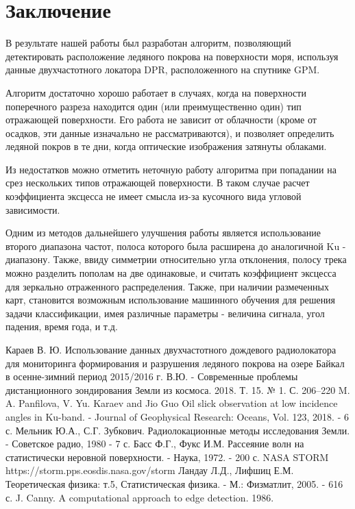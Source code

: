 \section{Заключение}

В результате нашей работы был разработан алгоритм, позволяющий детектировать расположение ледяного покрова на
поверхности моря, используя данные двухчастотного локатора DPR, расположенного на спутнике GPM. 

Алгоритм достаточно хорошо работает в случаях, когда на поверхности поперечного разреза находится один (или
преимущественно один) тип отражающей поверхности. Его работа не зависит от облачности (кроме от осадков, эти данные изначально не
рассматриваются), и позволяет определить ледяной покров в те дни, когда оптические изображения затянуты облаками. 

Из недостатков можно отметить неточную работу алгоритма при попадании на срез нескольких типов отражающей поверхности. В
таком случае расчет коэффициента эксцесса не имеет смысла из-за кусочного вида угловой зависимости. 

Одним из методов дальнейшего улучшения работы является использование второго диапазона частот, полоса которого была
расширена до аналогичной Ku - диапазону. Также, ввиду симметрии относительно угла отклонения, полосу трека можно
разделить пополам на две одинаковые, и считать коэффициент эксцесса для зеркально отраженного распределения. Также, при
наличии размеченных карт, становится возможным использование машинного обучения для решения задачи классификации, имея
различные параметры - величина сигнала, угол падения, время года, и т.д. 


\newpage
{}
\begin{thebibliography}{99}
 Караев В. Ю. Использование данных двухчастотного дождевого радиолокатора для мониторинга формирования
и разрушения ледяного покрова на озере Байкал в осенне-зимний период 2015/2016 г. В.Ю. - Современные проблемы
дистанционного зондирования Земли из космоса. 2018. Т. 15. № 1. С. 206–220
 M. A. Panfilova, V. Yu. Karaev and Jio Guo Oil slick observation at low incidence angles in Ku-band. -
Journal of Geophysical Research: Oceans, Vol. 123, 2018. - 6 с.
 Мельник Ю.А., С.Г. Зубкович. Радиолокационные методы исследования Земли. - Советское радио, 1980 - 7 с.
 Басс Ф.Г., Фукс И.М. Рассеяние волн на статистически неровной поверхности. - Наука, 1972. - 200 с.
 NASA STORM https://storm.pps.eosdis.nasa.gov/storm
 Ландау Л.Д., Лифшиц Е.М. Теоретическая физика: т.5, Статистическая физика. - М.: Физматлит, 2005. - 616 с.
 J. Canny. A computational approach to edge detection. 1986.
\end{thebibliography}

